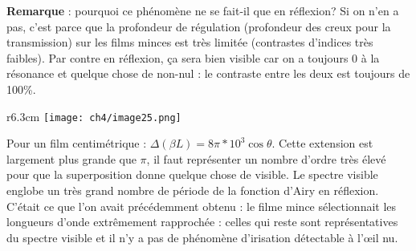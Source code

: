 \newpage
\textbf{Remarque} : pourquoi ce phénomène ne se fait-il que en réflexion? Si on n'en a pas, c'est 
parce que la profondeur de régulation (profondeur des creux pour la transmission) sur les films 
minces est très limitée (contrastes d'indices très faibles). Par contre en réflexion, ça sera 
bien visible car on a toujours 0 à la résonance et quelque chose de non-nul : le contraste entre 
les deux est toujours de 100\%.\\

	\begin{wrapfigure}[9]{r}{6.3cm}
	\vspace{-8mm}
	\texttt{[image: ch4/image25.png]}
	\end{wrapfigure}
Pour un film centimétrique : $\Delta(\beta L) = 8\pi*10^3\cos\theta$. Cette extension est largement 
plus grande que $\pi$, il faut représenter un nombre d'ordre très élevé pour que la superposition 
donne quelque chose de visible. Le spectre visible englobe un très grand nombre de période de la 
fonction d'Airy en réflexion. C'était ce que l'on avait précédemment obtenu : le filme mince 
sélectionnait les longueurs d'onde extrêmement rapprochée : celles qui reste sont représentatives 
du spectre visible et il n'y a pas de phénomène d'irisation détectable à l’œil nu.

































